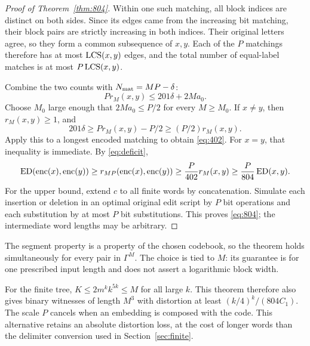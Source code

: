 \begin{proof}[Proof of Theorem~\ref{thm:804}]
Within one such matching, all block indices are distinct on both
sides. Since its edges came from the increasing bit matching, their
block pairs are strictly increasing in both indices. Their original
letters agree, so they form a common subsequence of $x,y$. Each of the
$P$ matchings therefore has at most $\operatorname{LCS}(x,y)$ edges, and the total
number of equal-label matches is at most $P\operatorname{LCS}(x,y)$.

Combine the two counts with $N_{\rm mat}=MP-\delta$:
\begin{equation}\label{eq:code-additive}
 P r_M(x,y)\leq201\delta+2Ma_0.
\end{equation}
Choose $M_0$ large enough that $2Ma_0\leq P/2$ for every $M\geq M_0$.
If $x\ne y$, then $r_M(x,y)\geq1$, and
\[
 201\delta\geq P r_M(x,y)-P/2
 \geq(P/2)r_M(x,y).
\]
Apply this to a longest encoded matching to obtain \eqref{eq:402}.
For $x=y$, that inequality is immediate. By \eqref{eq:deficit},
\[
 \operatorname{ED}(\operatorname{enc}(x),\operatorname{enc}(y))
 \geq r_{MP}(\operatorname{enc}(x),\operatorname{enc}(y))
 \geq\frac P{402}r_M(x,y)
 \geq\frac P{804}\operatorname{ED}(x,y).
\]
For the upper bound, extend $c$ to all finite words by concatenation.
Simulate each insertion or deletion in an optimal original edit script
by $P$ bit operations and each substitution by at most $P$ bit
substitutions. This proves \eqref{eq:804}; the intermediate word lengths
may be arbitrary.
\end{proof}

The segment property is a property of the chosen codebook, so the
theorem holds simultaneously for every pair in $\Gamma^M$. The choice
is tied to $M$: its guarantee is for one prescribed input length and
does not assert a logarithmic block width.

For the finite tree, $K\leq2m^k k^{5k}\leq M$ for all large $k$.
This theorem therefore also gives binary witnesses of length $M^3$
with distortion at least $(k/4)^k/(804C_1)$. The scale $P$ cancels
when an embedding is composed with the code. This alternative retains
an absolute distortion loss, at the cost of longer words than the
delimiter conversion used in Section~\ref{sec:finite}.
